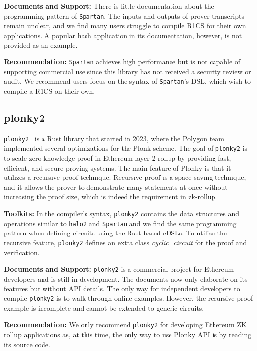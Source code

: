 \documentclass[letterpaper,twocolumn,10pt]{article}
\theoremstyle{definition}
\newcommand{\mypara}[1]{\noindent\textbf{{#1: }}}
\newcommand{\new}[1]{{#1}\xspace}
\newcommand{\lib}[1]{\texttt{#1}\xspace}
\begin{document}
\mypara{Documents and Support} There is little documentation about the programming pattern of \lib{Spartan}. The inputs and outputs of prover transcripts remain unclear, and we find many users struggle to compile R1CS for their own applications. A popular hash application in its documentation, however, is not provided as an example. 

\mypara{Recommendation} \lib{Spartan} achieves high performance but is not capable of supporting commercial use since this library has not received a security review or audit. We recommend users focus on the syntax of \lib{Spartan}'s DSL, which wish to compile a R1CS on their own. 

\subsection{plonky2}
\lib{plonky2}~\cite{plonky2} is a Rust library that started in 2023, where the Polygon team implemented several optimizations for the Plonk scheme. The goal of \lib{plonky2} is to scale zero-knowledge proof in Ethereum layer 2 rollup by providing fast, efficient, and secure proving systems. The main feature of Plonky is that it utilizes a recursive proof technique. Recursive proof is a space-saving technique, and it allows the prover to demonstrate many statements at once without increasing the proof size, which is indeed the requirement in zk-rollup. 

\mypara{Toolkits} \new{In the compiler's syntax, \lib{plonky2} contains the data structures and operations similar to \lib{halo2} \cite{halo2} and \lib{Spartan} \cite{spartan} and we find the same programming pattern when defining circuits using the Rust-based eDSLs.} To utilize the recursive feature, \lib{plonky2} defines an extra class \textit{cyclic\_circuit} for the proof and verification.

\mypara{Documents and Support} \lib{plonky2} is a commercial project for Ethereum developers and is still in development. The documents now only elaborate on its features but without API details. The only way for independent developers to compile \lib{plonky2} is to walk through online examples. However, the recursive proof example is incomplete and cannot be extended to generic circuits.

\mypara{Recommendation} We only recommend \lib{plonky2} for developing Ethereum ZK rollup applications as, at this time, the only way to use Plonky API is by reading its source code.





%
%
%
%
%  
%
%


%
%
\end{document}
